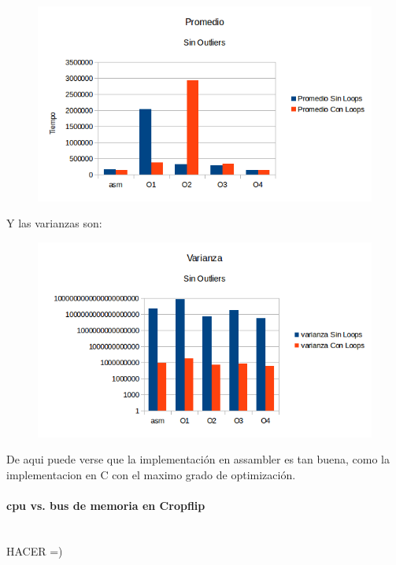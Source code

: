 \documentclass[a4paper]{article}
\begin{document}
\begin{figure}[h!]
  \begin{center}
	\includegraphics[scale=0.7]{GraficosTesting/crop/PSO.png}
	\label{nombreparareferenciar}
  \end{center}
\end{figure}

Y las varianzas son:

\begin{figure}[h!]
  \begin{center}
	\includegraphics[scale=0.7]{GraficosTesting/crop/VSO.png}
	\label{nombreparareferenciar}
  \end{center}
\end{figure}

De aqui puede verse que la implementación en assambler es tan buena, como la implementacion en C con el maximo grado de optimización.

\paragraph{\textbf{cpu vs. bus de memoria en Cropflip} }
\\
HACER =)
\end{document}
